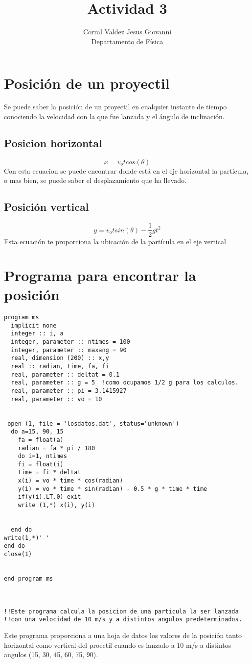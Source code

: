 \documentclass{article}
\title{Actividad 3}
\author{Corral Valdez Jesus Giovanni\\
Departamento de Física
}
\begin{document}
\maketitle
\clearpage
\section{Posición de un proyectil}
Se puede saber la posición de un proyectil en cualquier instante de tiempo \\
conociendo la velocidad con la que fue lanzada y el ángulo de inclinación.
\subsection{Posicion horizontal}
\begin{equation}
x = v_o t cos(\theta)
\end{equation}
Con esta ecuacion se puede encontrar donde está en el eje horizontal la partícula, o mas bien, se puede saber el desplazamiento que ha llevado.
\subsection{Posición vertical}
\begin{equation}
y = v_o t sin(\theta) - \frac {1} {2} gt^2
\end{equation}
Esta ecuación te proporciona la ubicación de la partícula en el eje vertical
\section{Programa para encontrar la posición}
\begin{verbatim}
program ms
  implicit none
  integer :: i, a
  integer, parameter :: ntimes = 100
  integer, parameter :: maxang = 90
  real, dimension (200) :: x,y
  real :: radian, time, fa, fi
  real, parameter :: deltat = 0.1
  real, parameter :: g = 5  !como ocupamos 1/2 g para los calculos.
  real, parameter :: pi = 3.1415927
  real, parameter :: vo = 10


 open (1, file = 'losdatos.dat', status='unknown')
  do a=15, 90, 15
	fa = float(a)
	radian = fa * pi / 180
	do i=1, ntimes
	fi = float(i)
	time = fi * deltat
	x(i) = vo * time * cos(radian)
	y(i) = vo * time * sin(radian) - 0.5 * g * time * time
	if(y(i).LT.0) exit	
   	write (1,*) x(i), y(i)


  end do
write(1,*)' '
end do
close(1)


end program ms
   


!!Este programa calcula la posicion de una particula la ser lanzada
!!con una velocidad de 10 m/s y a distintos angulos predeterminados.

\end{verbatim}
Este programa proporciona a una hoja de datos los valores de la posición tanto horizontal  como vertical del proectil cuando es lanzado a 10 m/s a distintos angulos (15, 30, 45, 60, 75, 90).
\clearpage
\end{document}
